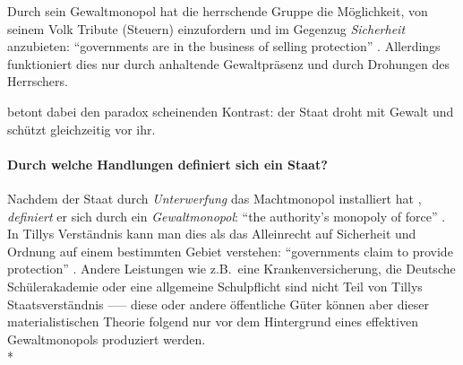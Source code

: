 Durch sein Gewaltmonopol hat die herrschende Gruppe die Möglichkeit, von seinem Volk Tribute (Steuern) einzufordern und im Gegenzug \emph{Sicherheit} anzubieten: ``governments are in the business of selling protection'' \parencite[175]{Tilly-1985-aa}.
Allerdings funktioniert dies nur durch anhaltende Gewaltpräsenz und durch Drohungen des Herrschers.

\citeauthor{Tilly-1985-aa} betont dabei den paradox scheinenden Kontrast: der Staat droht mit Gewalt und schützt gleichzeitig vor ihr.


\paragraph{Durch welche Handlungen definiert sich ein Staat?}

Nachdem der Staat durch \emph{Unterwerfung} das Machtmonopol installiert hat \parencite[vgl.][175]{Tilly-1985-aa}, \emph{definiert} er sich durch ein \emph{Gewaltmonopol}: ``the authority's monopoly of force'' \parencite[vgl.][172]{Tilly-1985-aa}.
In Tillys Verständnis kann man dies als das Alleinrecht auf Sicherheit und Ordnung auf einem bestimmten Gebiet verstehen: ``governments claim to provide protection'' \parencite[vgl.][172]{Tilly-1985-aa}.
Andere Leistungen wie z.B.\ eine Krankenversicherung, die Deutsche Schülerakademie oder eine allgemeine Schulpflicht sind nicht Teil von Tillys Staatsverständnis \parencite[vgl.][181]{Tilly-1985-aa} ––– diese oder andere öffentliche Güter können aber dieser materialistischen Theorie folgend nur vor dem Hintergrund eines effektiven Gewaltmonopols produziert werden.
\\*